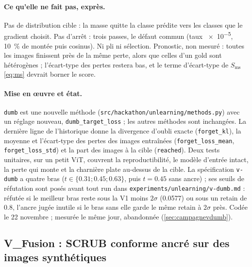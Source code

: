 \documentclass[11pt,a4paper]{article}
\newcommand{\code}[1]{\texttt{#1}}
\newcommand{\chemin}[1]{\nolinkurl{#1}}%
\begin{document}
\paragraph{Ce qu'elle ne fait pas, exprès.} Pas de distribution cible : la masse quitte la classe
prédite vers les classes que le gradient choisit. Pas d'arrêt : trois passes, le défaut commun
(taux \num{e-5}, \SI{10}{\percent} de montée puis cosinus). Ni pli ni sélection. Pronostic, non
mesuré : toutes les images finissent près de la même perte, alors que celles d'un gold sont
hétérogènes ; l'écart-type des pertes restera bas, et le terme d'écart-type de $S_{\text{ms}}$
\eqref{eq:ms} devrait borner le score.

\paragraph{Mise en œuvre et état.} \code{dumb} est une nouvelle méthode
(\chemin{src/hackathon/unlearning/methods.py}) avec un réglage nouveau,
\code{dumb\_target\_loss} ; les autres méthodes sont inchangées. La dernière ligne de l'historique
donne la divergence d'oubli exacte (\code{forget\_kl}), la moyenne et l'écart-type des pertes des
images entraînées (\code{forget\_loss\_mean}, \code{forget\_loss\_std}) et la part des images à la
cible (\code{reached}). Deux tests unitaires, sur un petit ViT, couvrent la reproductibilité, le
modèle d'entrée intact, la perte qui monte et la charnière plate au-dessus de la cible. La
spécification \code{v-dumb} a quatre bras ($t\in\{\num{0.31};\num{0.45};\num{0.63}\}$, puis
$t=\num{0.45}$ sans ancre) ; ses seuils de réfutation sont posés avant tout run dans
\chemin{experiments/unlearning/v-dumb.md} : réfutée si le meilleur bras reste sous la V1 moins
$2\sigma$ (\num{0.0577}) ou sous un retain de \num{0.8}, l'ancre jugée inutile si le bras sans elle
garde le même retain à $2\sigma$ près. Codée le 22 novembre ; mesurée le même jour, abandonnée
(\cref{sec:campagnevdumb}).

\subsection{V\_Fusion : SCRUB conforme ancré sur des images synthétiques}\label{sec:vfusion}
\end{document}
